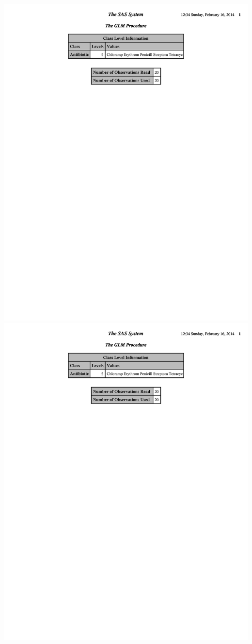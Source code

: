 \begin{center}
\includegraphics[scale=0.65,page=4,trim=60mm 0mm 30mm 0mm ]{BindFracContrasts}\includegraphics[scale=0.65,page=5,trim=30mm 0mm 60mm 0mm ]{BindFracContrasts}\\

\end{center}
